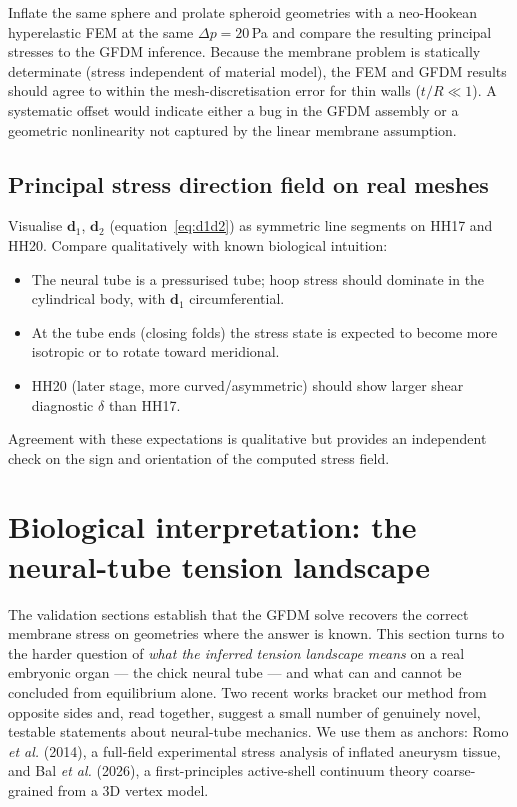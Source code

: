 \documentclass[11pt]{article}
\newcommand{\vv}[1]{\bm{#1}}          %
\begin{document}
Inflate the same sphere and prolate spheroid geometries with a
neo-Hookean hyperelastic FEM at the same $\Delta p=20$\,Pa and compare the
resulting principal stresses to the GFDM inference.  Because the membrane
problem is statically determinate (stress independent of material model),
the FEM and GFDM results should agree to within the mesh-discretisation
error for thin walls ($t/R\ll1$).  A systematic offset would indicate
either a bug in the GFDM assembly or a geometric nonlinearity not captured
by the linear membrane assumption.

\subsection{Principal stress direction field on real meshes}

Visualise $\vv{d}_1$, $\vv{d}_2$ (equation~\eqref{eq:d1d2}) as symmetric
line segments on HH17 and HH20.  Compare qualitatively with known
biological intuition:
\begin{itemize}[nosep]
  \item The neural tube is a pressurised tube; hoop stress should dominate
        in the cylindrical body, with $\vv{d}_1$ circumferential.
  \item At the tube ends (closing folds) the stress state is expected to
        become more isotropic or to rotate toward meridional.
  \item HH20 (later stage, more curved/asymmetric) should show larger
        shear diagnostic $\delta$ than HH17.
\end{itemize}
Agreement with these expectations is qualitative but provides an
independent check on the sign and orientation of the computed stress field.

\section{Biological interpretation: the neural-tube tension landscape}
\label{sec:neuraltube}

The validation sections establish that the GFDM solve recovers the correct
membrane stress on geometries where the answer is known.  This section turns to
the harder question of \emph{what the inferred tension landscape means} on a real
embryonic organ — the chick neural tube — and what can and cannot be concluded
from equilibrium alone.  Two recent works bracket our method from opposite sides
and, read together, suggest a small number of genuinely novel, testable
statements about neural-tube mechanics.  We use them as anchors: Romo
\textit{et al.} (2014), a full-field experimental stress analysis of inflated
aneurysm tissue, and Bal \textit{et al.} (2026), a first-principles active-shell
continuum theory coarse-grained from a 3D vertex model.
\end{document}
